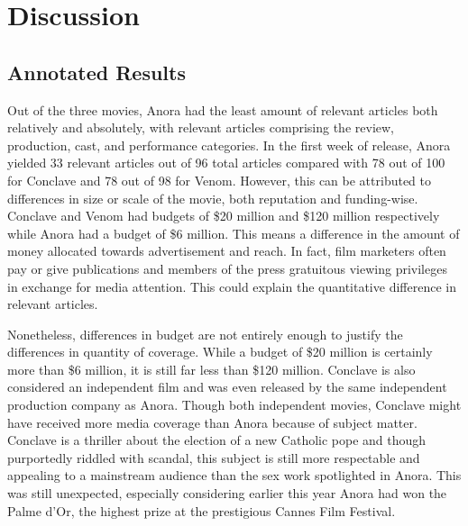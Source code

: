 \documentclass[letterpaper]{article} %
\begin{document}
\section {Discussion} 
\subsection{Annotated Results}
Out of the three movies, Anora had the least amount of relevant articles both relatively and absolutely, with relevant articles comprising the review, production, cast, and performance categories. In the first week of release, Anora yielded 33 relevant articles out of 96 total articles compared with 78 out of 100 for Conclave and 78 out of 98 for Venom. However, this can be attributed to differences in size or scale of the movie, both reputation and funding-wise. Conclave and Venom had budgets of \$20 million and \$120 million respectively while Anora had a budget of \$6 million. This means a difference in the amount of money allocated towards advertisement and reach. In fact, film marketers often pay or give publications and members of the press gratuitous viewing privileges in exchange for media attention. This could explain the quantitative difference in relevant articles.

Nonetheless, differences in budget are not entirely enough to justify the differences in quantity of coverage. While a budget of \$20 million is certainly more than \$6 million, it is still far less than \$120 million. Conclave is also considered an independent film and was even released by the same independent production company as Anora. Though both independent movies, Conclave might have received more media coverage than Anora because of subject matter. Conclave is a thriller about the election of a new Catholic pope and though purportedly riddled with scandal, this subject is still more respectable and appealing to a mainstream audience than the sex work spotlighted in Anora. This was still unexpected, especially considering earlier this year Anora had won the Palme d’Or, the highest prize at the prestigious Cannes Film Festival.
\end{document}
